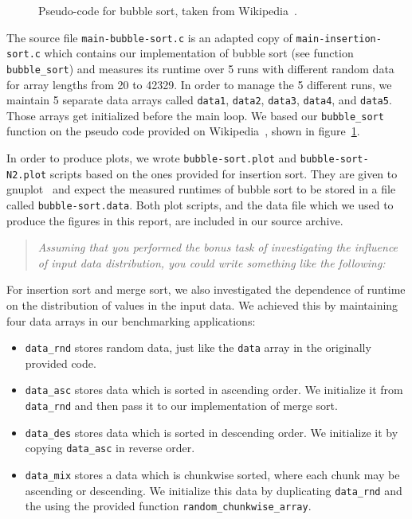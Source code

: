 \documentclass[a4paper,10pt]{article}
\begin{document}
\begin{figure}
  \centering
  \caption{
    Pseudo-code for bubble sort, taken from Wikipedia~\cite{wikipedia:bubble-sort}.
  }\label{fig:bubble-sort}
\end{figure}

The source file \texttt{main-bubble-sort.c} is an adapted copy of \texttt{main-insertion-sort.c} which contains our implementation of bubble sort (see function \texttt{bubble\_sort}) and measures its runtime over 5 runs with different random data for array lengths from 20 to 42329.
In order to manage the 5 different runs, we maintain 5 separate data arrays called \texttt{data1}, \texttt{data2}, \texttt{data3}, \texttt{data4}, and \texttt{data5}.
Those arrays get initialized before the main loop.
We based our \texttt{bubble\_sort} function on the pseudo code provided on Wikipedia~\cite{wikipedia:bubble-sort}, shown in figure~\ref{fig:bubble-sort}.

In order to produce plots, we wrote \texttt{bubble-sort.plot} and \texttt{bubble-sort-N2.plot} scripts based on the ones provided for insertion sort.
They are given to gnuplot~\cite{gnuplot} and expect the measured runtimes of bubble sort to be stored in a file called \texttt{bubble-sort.data}.
Both plot scripts, and the data file which we used to produce the figures in this report, are included in our source archive.

\begin{quotation}
  \itshape
  Assuming that you performed the bonus task of investigating the influence of input data distribution, you could write something like the following:
\end{quotation}

For insertion sort and merge sort, we also investigated the dependence of runtime on the distribution of values in the input data.
We achieved this by maintaining four data arrays in our benchmarking applications:
\begin{itemize}
\item
  \texttt{data\_rnd} stores random data, just like the \texttt{data} array in the originally provided code.
\item
  \texttt{data\_asc} stores data which is sorted in ascending order. We initialize it from \texttt{data\_rnd} and then pass it to our implementation of merge sort.
\item
  \texttt{data\_des} stores data which is sorted in descending order. We initialize it by copying \texttt{data\_asc} in reverse order.
\item
  \texttt{data\_mix} stores a data which is chunkwise sorted, where each chunk may be ascending or descending.
  We initialize this data by duplicating \texttt{data\_rnd} and the using the provided function \texttt{random\_chunkwise\_array}.
\end{itemize}
\end{document}
